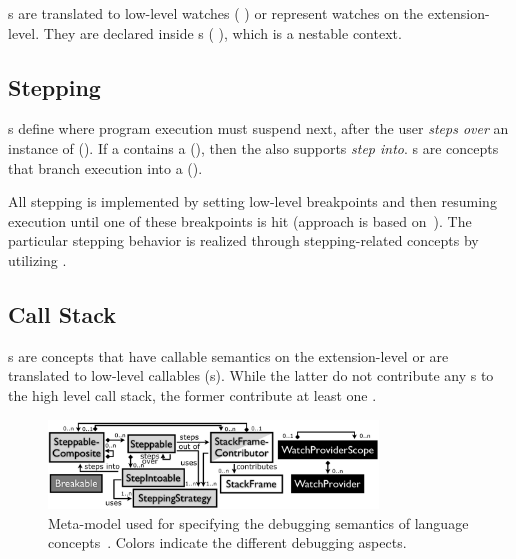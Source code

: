 s are translated to low-level watches (\eg
{}) or represent watches on the extension-level.
They are declared inside s (\eg
{}), which is a nestable context.

\subsection{Stepping} 
s define where program execution must suspend
next, after the user \emph{steps over} 
an instance of  (\eg {}). If a
 contains a  (\eg {}), 
then the  also supports \emph{step into}. s are
concepts that branch execution into a  (\eg {}).

All stepping is implemented by setting low-level breakpoints and then resuming
execution until one of these breakpoints is hit (approach is based
on~\cite{Wu06grammar}). The particular stepping behavior is realized through 
stepping-related concepts by utilizing .

\subsection{Call Stack}
s are
concepts that have callable semantics on the extension-level or are
translated to low-level callables (\eg {}s). While the latter do
not contribute any s to the high level call stack, the former
contribute at least one .

\begin{figure}[h]
  \vspace{-2mm}
  \centering
    \includegraphics[width=8.75cm]{./figures/debugger-concepts.png} 
    \vspace{-4mm}
    \caption{Meta-model used for specifying the debugging semantics of language
    concepts~\cite{DBLP:conf/adaEurope/AdaEuropeDeb}. Colors indicate the
    different debugging aspects.} 
  \label{specabs}
  \vspace{-2mm}
\end{figure}

